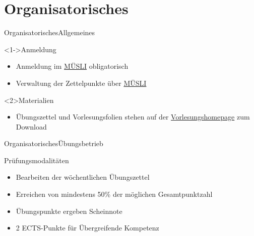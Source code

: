 \documentclass[
	vorläufig=false,
	datum=2016-10-21,
	titel={Einführung und grundlegende Bedienung},
	web=true,
]{../tex/latexkurs-slides}
\begin{document}
\section{Organisatorisches}

\begin{frame}[t]{Organisatorisches}{Allgemeines}
	\begin{block}<1->{Anmeldung}
		\begin{itemize}
			\item	 Anmeldung im \href{https://www.mathi.uni-heidelberg.de/muesli/lecture/view/601}{MÜSLI} obligatorisch
			\item Verwaltung der Zettelpunkte über \href{https://www.mathi.uni-heidelberg.de/muesli/lecture/view/484}{MÜSLI}
		\end{itemize}
	\end{block}
	\begin{block}{Materialien}
		\begin{itemize}
			\item Übungszettel und Vorlesungsfolien stehen auf der \href{http://latexkurs.github.io}{Vorlesungshomepage} zum Download
		\end{itemize}
	\end{block}
\end{frame}

\begin{frame}[t]{Organisatorisches}{Übungsbetrieb}
	\begin{block}{Prüfungsmodalitäten}
		\begin{itemize}
			\item Bearbeiten der wöchentlichen Übungszettel
			\item Erreichen von mindestens 50\% der möglichen Gesamtpunktzahl
			\item Übungspunkte ergeben Scheinnote 
			\item 2 ECTS-Punkte für Übergreifende Kompetenz
		\end{itemize}
	\end{block}
\end{frame}
\end{document}
